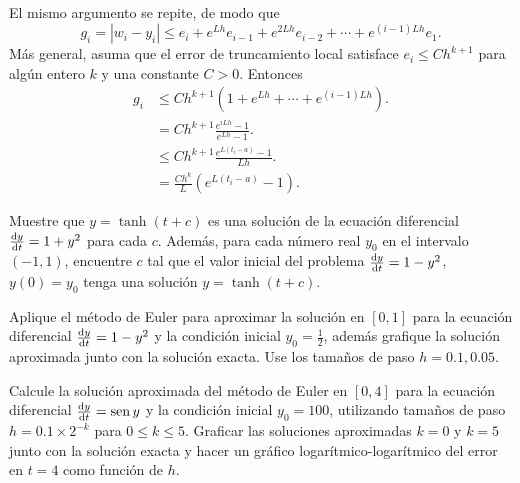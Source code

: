 El mismo argumento se repite, de modo que
\begin{equation*}
    g_{i}=
    \left|w_{i}-y_{i}\right|\leq
    e_{i}+
    e^{Lh}e_{i-1}+
    e^{2Lh}e_{i-2}+
    \cdots+
    e^{\left(i-1\right)Lh}
    e_{1}.
\end{equation*}
Más general, asuma que el error de truncamiento local satisface
$e_{i}\leq Ch^{k+1}$ para algún entero $k$ y una constante $C>0$.
Entonces
\begin{align*}
    g_{i} & \leq
    Ch^{k+1}
    \left(
    1+
    e^{Lh}+
    \cdots+
    e^{\left(i-1\right)Lh}
    \right).                                \\
          & =
    Ch^{k+1}
    \frac{e^{iLh}-1}{e^{Lh}-1}.             \\
          & \leq
    Ch^{k+1}
    \frac{e^{L\left(t_{i}-a\right)}-1}{Lh}. \\
          & =
    \frac{Ch^{k}}{L}
    \left(e^{L\left(t_{i}-a\right)}-1\right).
\end{align*}

\begin{questions}
    \question\label{question:first}

    Muestre que $y=\tanh\left(t+c\right)$ es una solución de la
    ecuación diferencial $\diff{y}{t}=1+y^{2}$ para cada $c$.
    Además, para cada número real $y_{0}$ en el intervalo
    $\left(-1,1\right)$, encuentre $c$ tal que el valor inicial del
    problema $\diff{y}{t}=1-y^{2}$, $y\left(0\right)=y_{0}$ tenga una
    solución $y=\tanh\left(t+c\right)$.

    \question

    Aplique el método de Euler para aproximar la solución en
    $\left[0,1\right]$ para la ecuación diferencial
    $\diff{y}{t}=1-y^{2}$ y la condición inicial $y_{0}=\frac{1}{2}$,
    además grafique la solución aproximada junto con la solución
    exacta.
    Use los tamaños de paso $h=0.1,0.05$.

    \question

    Calcule la solución aproximada del método de Euler en
    $\left[0,4\right]$ para la ecuación diferencial
    $\diff{y}{t}=\operatorname{sen}y$ y la condición inicial
    $y_{0}=100$, utilizando tamaños de paso $h=0.1\times 2^{-k}$
    para $0\leq k\leq 5$.
    Graficar las soluciones aproximadas $k=0$ y $k=5$ junto con la
    solución exacta y hacer un gráfico logarítmico-logarítmico del
    error en $t=4$ como función de $h$.
\end{questions}


